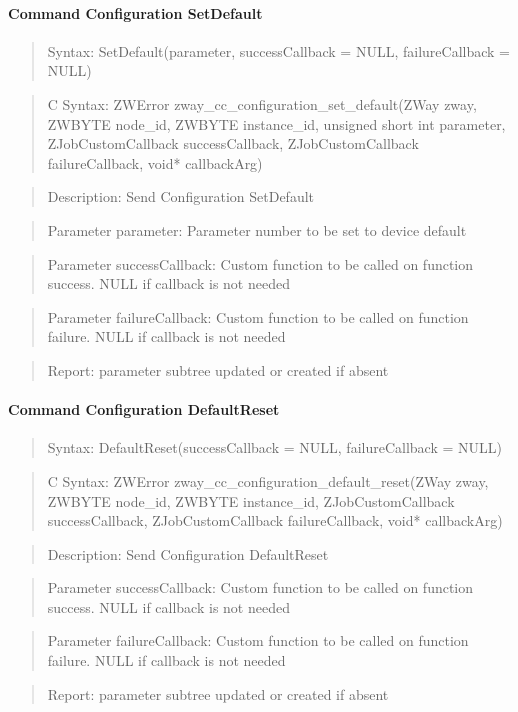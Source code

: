 \paragraph{Command Configuration SetDefault}
\begin{quote}Syntax: SetDefault(parameter, successCallback = NULL, failureCallback = NULL)\end{quote}
\begin{quote}C Syntax: ZWError zway\_cc\_configuration\_set\_default(ZWay zway, ZWBYTE node\_id, ZWBYTE instance\_id, unsigned short int parameter, ZJobCustomCallback successCallback, ZJobCustomCallback failureCallback, void* callbackArg)\end{quote}
\begin{quote}Description: Send Configuration SetDefault\end{quote}
\begin{quote}Parameter parameter: Parameter number to be set to device default\end{quote}
\begin{quote}Parameter successCallback: Custom function to be called on function success. NULL if callback is not needed\end{quote}
\begin{quote}Parameter failureCallback: Custom function to be called on function failure. NULL if callback is not needed\end{quote}
\begin{quote}Report: parameter subtree updated or created if absent\end{quote}

\paragraph{Command Configuration DefaultReset}
\begin{quote}Syntax: DefaultReset(successCallback = NULL, failureCallback = NULL)\end{quote}
\begin{quote}C Syntax: ZWError zway\_cc\_configuration\_default\_reset(ZWay zway, ZWBYTE node\_id, ZWBYTE instance\_id, ZJobCustomCallback successCallback, ZJobCustomCallback failureCallback, void* callbackArg)\end{quote}
\begin{quote}Description: Send Configuration DefaultReset\end{quote}
\begin{quote}Parameter successCallback: Custom function to be called on function success. NULL if callback is not needed\end{quote}
\begin{quote}Parameter failureCallback: Custom function to be called on function failure. NULL if callback is not needed\end{quote}
\begin{quote}Report: parameter subtree updated or created if absent\end{quote}


